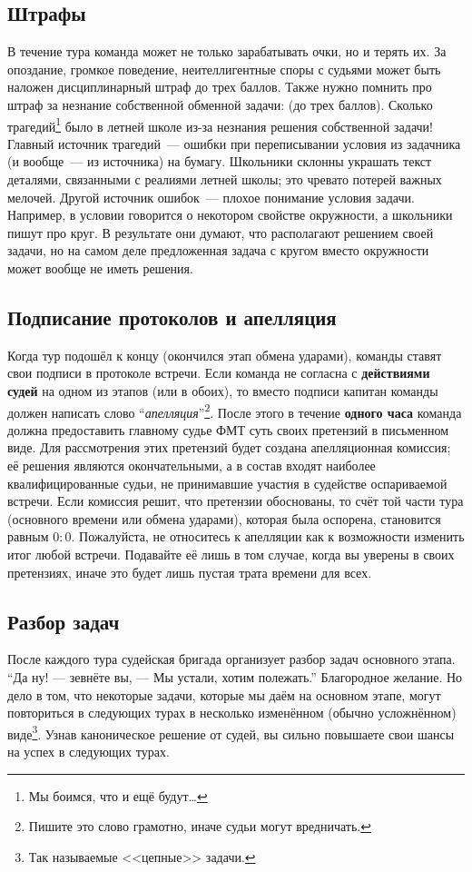 \documentclass[12pt]{article}
\begin{document}
\subsection*{Штрафы}
В течение тура команда может не только зарабатывать очки, но и терять их. За опоздание, громкое поведение, неителлигентные споры с судьями может быть наложен дисциплинарный штраф до трех баллов. Также нужно помнить про штраф за незнание собственной обменной задачи: (до трех баллов). Сколько трагедий\footnote{Мы боимся, что и ещё будут\ldots} было в летней школе из-за незнания решения собственной задачи! Главный источник трагедий~--- ошибки при переписывании условия из задачника (и вообще~--- из источника) на бумагу. Школьники склонны украшать текст деталями, связанными с реалиями летней школы; это чревато потерей важных мелочей. Другой источник ошибок~--- плохое понимание условия задачи. Например, в условии говорится о некотором свойстве окружности, а школьники пишут про круг. В результате они думают, что располагают решением своей задачи, но на самом деле предложенная задача с кругом вместо окружности может вообще не иметь решения.

\subsection*{Подписание протоколов и апелляция}
Когда тур подошёл к концу (окончился этап обмена ударами), команды ставят свои подписи в протоколе встречи. Если команда не согласна с {\bf действиями судей} на одном из этапов (или в обоих), то вместо подписи капитан команды должен написать слово ``\textsl{апелляция}''\footnote{Пишите это слово грамотно, иначе судьи могут вредничать.}. После этого в течение {\bf одного часа} команда должна предоставить главному судье ФМТ суть своих претензий в письменном виде. Для рассмотрения этих претензий будет создана апелляционная комиссия; её решения являются окончательными, а в состав входят наиболее квалифицированные судьи, не принимавшие участия в судействе оспариваемой встречи. Если комиссия решит, что претензии обоснованы, то счёт той части тура (основного времени или обмена ударами), которая была оспорена, становится равным $0:0$. Пожалуйста, не относитесь к апелляции как к возможности изменить итог любой встречи. Подавайте её лишь в том случае, когда вы уверены в своих претензиях, иначе это будет лишь пустая трата времени для всех.

\subsection*{Разбор задач}
После каждого тура судейская бригада организует разбор задач основного этапа. ``Да ну! --- зевнёте вы, --- Мы устали, хотим полежать.'' Благородное желание. Но дело в том, что некоторые задачи, которые мы даём на основном этапе, могут повториться в следующих турах в несколько изменённом (обычно усложнённом) виде\footnote{Так называемые <<цепные>> задачи.}. Узнав каноническое решение от судей, вы сильно повышаете свои шансы на успех в следующих турах.
\end{document}
